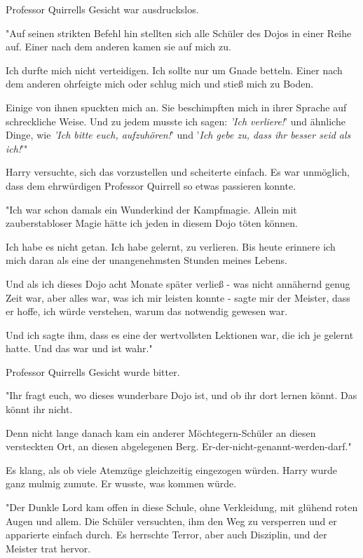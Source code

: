 {Professor Quirrells Gesicht war ausdruckslos.

"Auf seinen strikten Befehl hin stellten sich alle Schüler des Dojos in einer Reihe auf. Einer nach dem anderen kamen sie auf mich zu.

Ich durfte mich nicht verteidigen. Ich sollte nur um Gnade betteln. Einer nach dem anderen ohrfeigte mich oder schlug mich und stieß mich zu Boden.

Einige von ihnen spuckten mich an. Sie beschimpften mich in ihrer Sprache auf schreckliche Weise. Und zu jedem musste ich sagen: \emph{'Ich verliere!}' und ähnliche Dinge, wie \emph{'Ich bitte euch, aufzuhören!}' und '\emph{Ich gebe zu, dass ihr besser seid als ich!}'"

Harry versuchte, sich das vorzustellen und scheiterte einfach. Es war unmöglich, dass dem ehrwürdigen Professor Quirrell so etwas passieren konnte.

"Ich war schon damals ein Wunderkind der Kampfmagie. Allein mit zauberstabloser Magie hätte ich jeden in diesem Dojo töten können.

Ich habe es nicht getan. Ich habe gelernt, zu verlieren. Bis heute erinnere ich mich daran als eine der unangenehmsten Stunden meines Lebens.

Und als ich dieses Dojo acht Monate später verließ - was nicht annähernd genug Zeit war, aber alles war, was ich mir leisten konnte - sagte mir der Meister, dass er hoffe, ich würde verstehen, warum das notwendig gewesen war.

Und ich sagte ihm, dass es eine der wertvollsten Lektionen war, die ich je gelernt hatte. Und das war und ist wahr."

Professor Quirrells Gesicht wurde bitter.

"Ihr fragt euch, wo dieses wunderbare Dojo ist, und ob ihr dort lernen könnt. Das könnt ihr nicht.

Denn nicht lange danach kam ein anderer Möchtegern-Schüler an diesen versteckten Ort, an diesen abgelegenen Berg. Er-der-nicht-genannt-werden-darf."

Es klang, als ob viele Atemzüge gleichzeitig eingezogen würden. Harry wurde ganz mulmig zumute. Er wusste, was kommen würde.

"Der Dunkle Lord kam offen in diese Schule, ohne Verkleidung, mit glühend roten Augen und allem. Die Schüler versuchten, ihm den Weg zu versperren und er apparierte einfach durch. Es herrschte Terror, aber auch Disziplin, und der Meister trat hervor.

}

